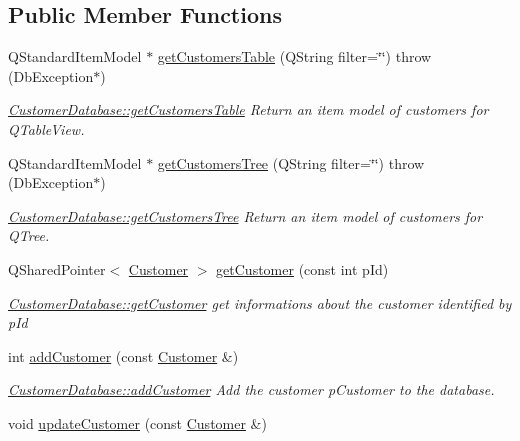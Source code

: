 \subsection*{Public Member Functions}
\begin{DoxyCompactItemize}
\item 
Q\+Standard\+Item\+Model $\ast$ \hyperlink{classCustomerDatabase_a2e25b4f197ccbdd2c5753558dbe18d4b}{get\+Customers\+Table} (Q\+String filter=\char`\"{}\char`\"{})  throw (\+Db\+Exception$\ast$)
\begin{DoxyCompactList}\small\item\em \hyperlink{classCustomerDatabase_a2e25b4f197ccbdd2c5753558dbe18d4b}{Customer\+Database\+::get\+Customers\+Table} Return an item model of customers for Q\+Table\+View. \end{DoxyCompactList}\item 
Q\+Standard\+Item\+Model $\ast$ \hyperlink{classCustomerDatabase_a0fc1ca7fe1020cef19b2423531c4e934}{get\+Customers\+Tree} (Q\+String filter=\char`\"{}\char`\"{})  throw (\+Db\+Exception$\ast$)
\begin{DoxyCompactList}\small\item\em \hyperlink{classCustomerDatabase_a0fc1ca7fe1020cef19b2423531c4e934}{Customer\+Database\+::get\+Customers\+Tree} Return an item model of customers for Q\+Tree. \end{DoxyCompactList}\item 
Q\+Shared\+Pointer$<$ \hyperlink{classCustomer}{Customer} $>$ \hyperlink{classCustomerDatabase_aeb91691412f371795a0473555e31614c}{get\+Customer} (const int p\+Id)
\begin{DoxyCompactList}\small\item\em \hyperlink{classCustomerDatabase_aeb91691412f371795a0473555e31614c}{Customer\+Database\+::get\+Customer} get informations about the customer identified by {\itshape p\+Id} \end{DoxyCompactList}\item 
int \hyperlink{classCustomerDatabase_a522337809fe7588ddc8b5eb27b0cb640}{add\+Customer} (const \hyperlink{classCustomer}{Customer} \&)
\begin{DoxyCompactList}\small\item\em \hyperlink{classCustomerDatabase_a522337809fe7588ddc8b5eb27b0cb640}{Customer\+Database\+::add\+Customer} Add the customer {\itshape p\+Customer} to the database. \end{DoxyCompactList}\item 
\hypertarget{classCustomerDatabase_a2ae17af9bcbf889dec21b4acae3161e1}{void \hyperlink{classCustomerDatabase_a2ae17af9bcbf889dec21b4acae3161e1}{update\+Customer} (const \hyperlink{classCustomer}{Customer} \&)}\label{classCustomerDatabase_a2ae17af9bcbf889dec21b4acae3161e1}


\end{DoxyCompactItemize}
